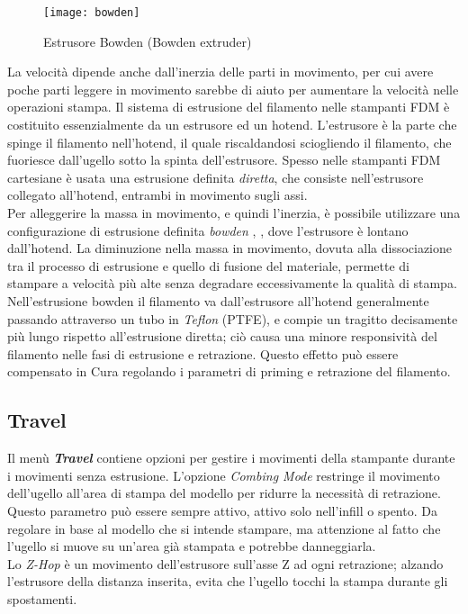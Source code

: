 \begin{wrapfigure} {R} {0.5\textwidth}
	\texttt{[image: bowden]}
    \caption{Estrusore Bowden (Bowden extruder)}
    \label{fig:bowden}
\end{wrapfigure}
La velocità dipende anche dall'inerzia delle parti in movimento, per cui avere poche parti leggere in movimento sarebbe di aiuto per aumentare la velocità nelle operazioni stampa.
Il sistema di estrusione del filamento nelle stampanti FDM è costituito essenzialmente da un estrusore ed un hotend. L'estrusore è la parte che spinge il filamento nell'hotend, il quale riscaldandosi sciogliendo il filamento, che fuoriesce dall'ugello sotto la spinta dell'estrusore. Spesso nelle stampanti FDM cartesiane è usata una estrusione definita \emph{diretta}, che consiste nell'estrusore collegato all'hotend, entrambi in movimento sugli assi.\\
Per alleggerire la massa in movimento, e quindi l'inerzia, è possibile utilizzare una configurazione di estrusione definita \emph{bowden} \parencite{Reference54}, \parencite{Reference55}, dove l'estrusore è lontano dall'hotend. La diminuzione nella massa in movimento, dovuta alla dissociazione tra il processo di estrusione e quello di fusione del materiale, permette di stampare a velocità più alte senza degradare eccessivamente la qualità di stampa. Nell'estrusione bowden il filamento va dall'estrusore all'hotend generalmente passando attraverso un tubo in \emph{Teflon} (PTFE), e compie un tragitto decisamente più lungo rispetto all'estrusione diretta; ciò causa una minore responsività del filamento nelle fasi di estrusione e retrazione. Questo effetto può essere compensato in Cura regolando i parametri di priming e retrazione del filamento.

\subsection{Travel}
Il menù \emph{\textbf{Travel}} contiene opzioni per gestire i movimenti della stampante durante i movimenti senza estrusione. L'opzione \emph{Combing Mode} restringe il movimento dell'ugello all'area di stampa del modello per ridurre la necessità di retrazione. Questo parametro può essere sempre attivo, attivo solo nell'infill o spento. Da regolare in base al modello che si intende stampare, ma attenzione al fatto che l'ugello si muove su un'area già stampata e potrebbe danneggiarla.\\
Lo \emph{Z-Hop} è un movimento dell'estrusore sull'asse Z ad ogni retrazione; alzando l'estrusore della distanza inserita, evita che l'ugello tocchi la stampa durante gli spostamenti.


